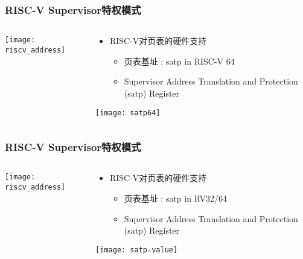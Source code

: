\begin{frame}   
	\frametitle{RISC-V Supervisor特权模式}
	
	\begin{columns}[t]
		
		\begin{column}{.5\textwidth}
			
			\texttt{[image: riscv\_address]}
			
		\end{column}
		
		
		\begin{column}{.5\textwidth}
			
			\begin{itemize}\large
				\item RISC-V对页表的硬件支持
				\begin{itemize}
					\item 页表基址 : satp in RISC-V 64
					\item  Supervisor Address Translation and Protection (satp) Register
					
					
				\end{itemize}
			\end{itemize}
             \texttt{[image: satp64]}
		\end{column}
		
		
	\end{columns}
	
\end{frame}


\begin{frame}   
	\frametitle{RISC-V Supervisor特权模式}
	
	\begin{columns}[t]
		
		\begin{column}{.5\textwidth}
			
			\texttt{[image: riscv\_address]}
			
		\end{column}
		
		
		\begin{column}{.5\textwidth}
			
			\begin{itemize}\large
				\item RISC-V对页表的硬件支持
				\begin{itemize}
					\item 页表基址 : satp in RV32/64
					\item  Supervisor Address Translation and Protection (satp) Register
					
					
				\end{itemize}
			\end{itemize}
			\texttt{[image: satp-value]}
		\end{column}
		
		
	\end{columns}
	
\end{frame}




